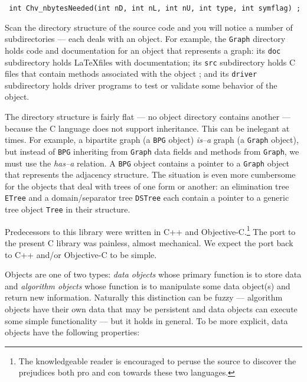 \centerline{\tt 
int Chv\_nbytesNeeded(int nD, int nL, int nU, int type, int symflag) ;}
\par
Scan the directory structure of the source code and you will notice
a number of subdirectories --- each deals with an object.
For example, 
the {\tt Graph} directory holds code and documentation for an
object that represents a graph:
its {\tt doc} subdirectory holds \LaTeX files with documentation;
its {\tt src} subdirectory holds C files that contain methods
associated with the object ;
and its {\tt driver} subdirectory holds driver programs to test or
validate some behavior of the object.
\par
The directory structure is fairly flat --- no object directory
contains another --- because the C language does not support
inheritance.
This can be inelegant at times.
For example, a bipartite graph (a {\tt BPG} object) 
{\it is--a} graph (a {\tt Graph} object), but instead of {\tt BPG}
inheriting from {\tt Graph} data fields and methods from {\tt Graph},
we must use the {\it has--a} relation.
A {\tt BPG} object contains a pointer to a {\tt Graph} object
that represents the adjacency structure.
The situation is even more cumbersome for the objects that deal
with trees of one form or another: an elimination tree {\tt ETree}
and a domain/separator tree {\tt DSTree} each contain a pointer to
a generic tree object {\tt Tree} in their structure.
\par
Predecessors to this library were written in C++ and 
Objective-C.\footnote{The knowledgeable reader is encouraged to
peruse the source to discover the prejudices both pro and con
towards these two languages.}
The port to the present C library was painless, almost mechanical.
We expect the port back to C++ and/or Objective-C to be simple.
\par
Objects are one of two types: 
{\it data objects} whose primary function is to store data
and
{\it algorithm objects} whose function is to manipulate some data
object(s) and return new information.
Naturally this distinction can be fuzzy --- algorithm objects have
their own data that may be persistent and data objects can execute
some simple functionality --- but it holds in general.
To be more explicit, data objects have the following properties:
